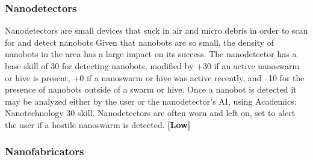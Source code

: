 \subsubsection{Nanodetectors}

Nanodetectors are small devices that suck in air and 
micro debris in order to scan for and detect nanobots
Given that nanobots are so small, the density of
nanobots in the area has a large impact on its success. 
The nanodetector has a base skill of 30 for detecting 
nanobots, modified by +30 if an active nanoswarm or 
hive is present, +0 if a nanoswarm or hive was active 
recently, and –10 for the presence of nanobots outside 
of a swarm or hive. Once a nanobot is detected it may 
be analyzed either by the user or the nanodetector's AI, 
using Academics: Nanotechnology 30 skill. Nanodetectors
are often worn and left on, set to alert the user
if a hostile nanoswarm is detected. \textbf{[Low]}

\subsubsection{Nanofabricators}


